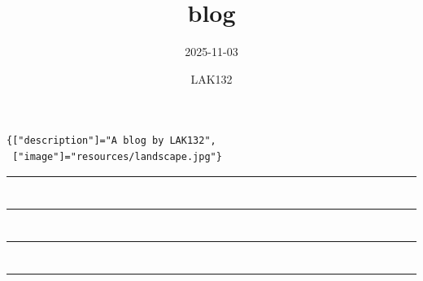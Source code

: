 \documentclass{article}
\title{blog}
\subtitle{2025-11-03}
\author{LAK132}
\newcommand{\post}[1]{
\def\postpath{posts/#1/}
\section*{\href{\postpath index.html}{}}


\hrule}
\begin{document}
\begin{lstlisting}[language=page-meta]
{["description"]="A blog by LAK132",
 ["image"]="resources/landscape.jpg"}
\end{lstlisting}

\maketitle
\hrule

\post{dell-dock-conversion}

\post{thinkpad-dock-repair}

\post{tppi}
\end{document}

